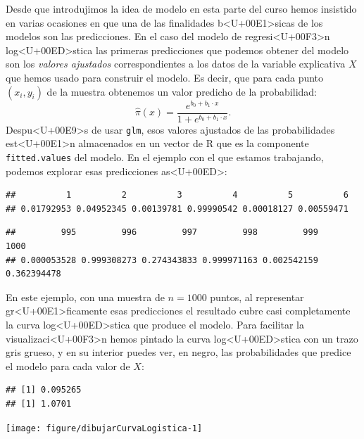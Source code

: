 \documentclass[10pt,a4paper]{article}
\begin{document}
Desde que introdujimos la idea de modelo en esta parte del curso hemos insistido en varias ocasiones en que una de las finalidades b<U+00E1>sicas de los modelos son las predicciones. En el caso del modelo de regresi<U+00F3>n log<U+00ED>stica las primeras predicciones que podemos obtener del modelo son los {\em valores ajustados} correspondientes  a los datos de la variable explicativa $X$ que hemos usado para construir el modelo. Es decir, que para cada punto $(x_i, y_i)$ de la muestra obtenemos un valor predicho de la probabilidad:
\[\hat\pi(x)=\dfrac{e^{b_0+b_1\cdot x}}{1+e^{b_0+b_1\cdot x}}.\]
Despu<U+00E9>s de usar {\tt glm}, esos valores ajustados de las probabilidades est<U+00E1>n almacenados en un vector de R que es la componente {\tt fitted.values} del modelo. En el ejemplo con el que estamos trabajando, podemos explorar esas predicciones as<U+00ED>:

\begin{knitrout}
\color{fgcolor}\begin{kframe}
\begin{alltt}
\hlopt{$}
\end{alltt}
\begin{verbatim}
##          1          2          3          4          5          6 
## 0.01792953 0.04952345 0.00139781 0.99990542 0.00018127 0.00559471
\end{verbatim}
\begin{alltt}
\hlopt{$}
\end{alltt}
\begin{verbatim}
##         995         996         997         998         999        1000 
## 0.000053528 0.999308273 0.274343833 0.999971163 0.002542159 0.362394478
\end{verbatim}
\end{kframe}
\end{knitrout}

En este ejemplo, con una muestra de $n = 1000$ puntos, al representar gr<U+00E1>ficamente esas predicciones el resultado cubre casi completamente la curva log<U+00ED>stica que produce el modelo. Para facilitar la visualizaci<U+00F3>n hemos pintado la curva log<U+00ED>stica con un trazo gris grueso, y en su interior puedes ver, en negro, las probabilidades que predice el modelo para cada valor de $X$:

\begin{knitrout}
\color{fgcolor}\begin{kframe}
\begin{verbatim}
## [1] 0.095265
## [1] 1.0701
\end{verbatim}
\end{kframe}

{\centering \texttt{[image: figure/dibujarCurvaLogistica-1]} 

}



\end{knitrout}
\end{document}
